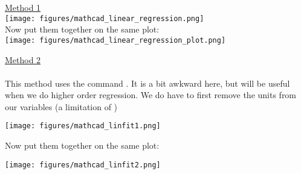 {\drawexampleline%

\underline{Method 1}\\

\texttt{[image: figures/mathcad\_linear\_regression.png]}\\

Now put them together on the same plot:\\

\texttt{[image: figures/mathcad\_linear\_regression\_plot.png]}

\drawexampleline%

\underline{Method 2}\\
\\

This method uses the command .  It is a bit awkward here, but will be useful when we do higher order regression. 
We do have to first remove the units from our variables (a limitation of )

\texttt{[image: figures/mathcad\_linfit1.png]}

Now put them together on the same plot:

\texttt{[image: figures/mathcad\_linfit2.png]}
}\\

